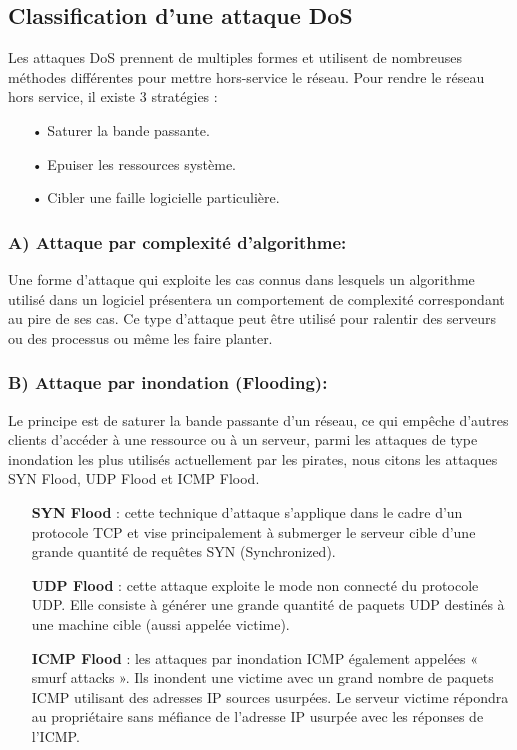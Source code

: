 \subsection{Classification d'une attaque DoS}
\label{rDoS}
Les attaques DoS prennent de multiples formes et utilisent de nombreuses méthodes différentes pour mettre hors-service le réseau.
Pour rendre le réseau hors service, il existe 3 stratégies :\\
\begin{itemize}
\item[•]Saturer la bande passante.
\item[•]Epuiser les ressources système.
\item[•]Cibler une faille logicielle particulière.
\end{itemize} 

\subsubsection{A) Attaque par complexité d’algorithme:}
Une forme d’attaque qui exploite les cas connus dans lesquels un algorithme utilisé dans un logiciel présentera un comportement de complexité correspondant au pire de ses cas. Ce type d’attaque peut être utilisé pour ralentir des serveurs ou des processus ou même les faire planter. 
\subsubsection{B) Attaque par inondation (Flooding):}
Le principe est de saturer la bande passante d’un réseau, ce qui empêche d'autres clients d’accéder à une ressource ou à un serveur, parmi les attaques de type inondation les plus utilisés actuellement par les pirates, nous citons les attaques SYN Flood, UDP Flood et ICMP Flood.\\
\begin{itemize}
\item[\textbf{SYN Flood}]: cette technique d’attaque s’applique dans le cadre d’un protocole TCP et vise principalement à submerger le serveur cible d’une grande quantité de requêtes SYN (Synchronized).\\
\item[\textbf{UDP Flood}]: cette attaque exploite le mode non connecté du protocole UDP. Elle consiste à générer une grande quantité de paquets UDP destinés à une machine cible (aussi appelée victime).\\
\item[\textbf{ICMP Flood}]: les attaques par inondation ICMP également appelées « smurf attacks ». Ils inondent une victime avec un grand nombre de paquets ICMP utilisant des adresses IP sources usurpées. Le serveur victime répondra au propriétaire sans méfiance de l'adresse IP usurpée avec les réponses de l'ICMP.\\
\end{itemize}

